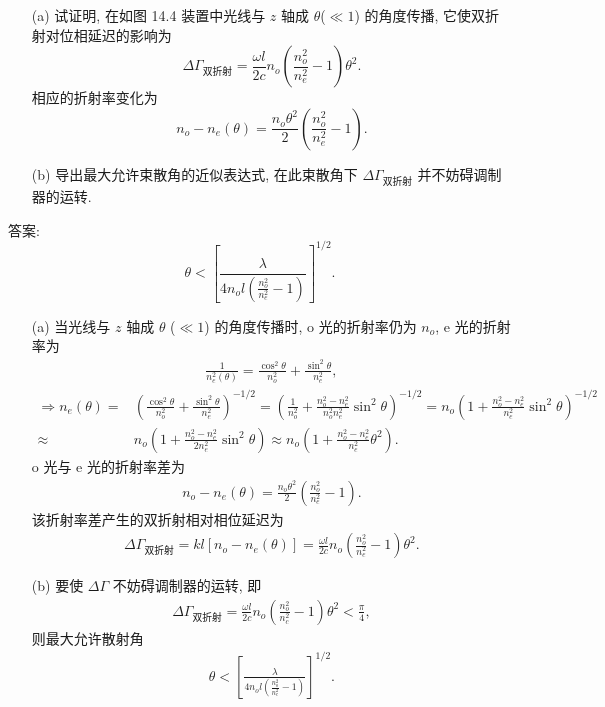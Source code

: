 \documentclass[twoside]{note}
\begin{document}
\begin{exe}
    \begin{itemize}
        \item[(a)] 试证明, 在如图 14.4 装置中光线与 $z$ 轴成 $\theta$($\ll 1$) 的角度传播, 它使双折射对位相延迟的影响为
        \[
            \Delta\Gamma_{\text{双折射}}=\frac{\omega l}{2c}n_o\left(\frac{n_o^2}{n_e^2}-1\right)\theta^2.
        \]
        相应的折射率变化为
        \[
            n_o-n_e(\theta)=\frac{n_o\theta^2}{2}\left(\frac{n_o^2}{n_e^2}-1\right).
        \]
        \item[(b)] 导出最大允许束散角的近似表达式, 在此束散角下 $\Delta\Gamma_{\text{双折射}}$ 并不妨碍调制器的运转.
    \end{itemize}
    答案:
    \[
        \theta<\left[\frac{\lambda}{4n_ol\left(\frac{n_o^2}{n_e^2}-1\right)}\right]^{1/2}.
    \]
\end{exe}
\begin{sol}
    \begin{itemize}
        \item[(a)] 当光线与 $z$ 轴成 $\theta$ ($\ll 1$) 的角度传播时, o 光的折射率仍为 $n_o$, e 光的折射率为
        \begin{align}
            \frac{1}{n_e^2(\theta)}=\frac{\cos^2\theta}{n_o^2}+\frac{\sin^2\theta}{n_e^2},
        \end{align}
        \begin{align}
            \Longrightarrow n_e(\theta)=&\left(\frac{\cos^2\theta}{n_o^2}+\frac{\sin^2\theta}{n_e^2}\right)^{-1/2}=\left(\frac{1}{n_o^2}+\frac{n_o^2-n_e^2}{n_o^2n_e^2}\sin^2\theta\right)^{-1/2}=n_o\left(1+\frac{n_o^2-n_e^2}{n_e^2}\sin^2\theta\right)^{-1/2}\\
            \approx&n_o\left(1+\frac{n_o^2-n_e^2}{2n_e^2}\sin^2\theta\right)\approx n_o\left(1+\frac{n_o^2-n_e^2}{n_e^2}\theta^2\right).
        \end{align}
        o 光与 e 光的折射率差为
        \begin{align}
            n_o-n_e(\theta)=\frac{n_o\theta^2}{2}\left(\frac{n_o^2}{n_e^2}-1\right).
        \end{align}
        该折射率差产生的双折射相对相位延迟为
        \begin{align}
            \Delta\Gamma_{\text{双折射}}=kl[n_o-n_e(\theta)]=\frac{\omega l}{2c}n_o\left(\frac{n_o^2}{n_e^2}-1\right)\theta^2.
        \end{align}
        \item[(b)] 要使 $\Delta\Gamma$ 不妨碍调制器的运转, 即
        \begin{align}
            \Delta\Gamma_{\text{双折射}}=\frac{\omega l}{2c}n_o\left(\frac{n_o^2}{n_c^2}-1\right)\theta^2<\frac{\pi}{4},
        \end{align}
        则最大允许散射角
        \begin{align}
            \theta<\left[\frac{\lambda}{4n_ol\left(\frac{n_o^2}{n_e^2}-1\right)}\right]^{1/2}.
        \end{align}
    \end{itemize}
\end{sol}
\end{document}
